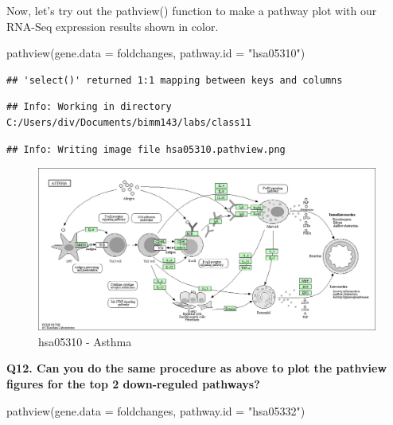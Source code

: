 \documentclass[
]{article}
\newenvironment{Shaded}{\begin{snugshade}}{\end{snugshade}}
\newcommand{\AttributeTok}[1]{\textcolor[rgb]{0.77,0.63,0.00}{#1}}
\newcommand{\FunctionTok}[1]{\textcolor[rgb]{0.00,0.00,0.00}{#1}}
\newcommand{\NormalTok}[1]{#1}
\newcommand{\StringTok}[1]{\textcolor[rgb]{0.31,0.60,0.02}{#1}}
\begin{document}
Now, let's try out the pathview() function to make a pathway plot with
our RNA-Seq expression results shown in color.

\begin{Shaded}
\begin{Highlighting}[]
\FunctionTok{pathview}\NormalTok{(}\AttributeTok{gene.data =}\NormalTok{ foldchanges, }\AttributeTok{pathway.id =} \StringTok{"hsa05310"}\NormalTok{)}
\end{Highlighting}
\end{Shaded}

\begin{verbatim}
## 'select()' returned 1:1 mapping between keys and columns
\end{verbatim}

\begin{verbatim}
## Info: Working in directory C:/Users/div/Documents/bimm143/labs/class11
\end{verbatim}

\begin{verbatim}
## Info: Writing image file hsa05310.pathview.png
\end{verbatim}

\begin{figure}
\centering
\includegraphics{hsa05310.png}
\caption{hsa05310 - Asthma}
\end{figure}

\textbf{Q12. Can you do the same procedure as above to plot the pathview
figures for the top 2 down-reguled pathways?}

\begin{Shaded}
\begin{Highlighting}[]
\FunctionTok{pathview}\NormalTok{(}\AttributeTok{gene.data =}\NormalTok{ foldchanges, }\AttributeTok{pathway.id =} \StringTok{"hsa05332"}\NormalTok{)}
\end{Highlighting}
\end{Shaded}
\end{document}
